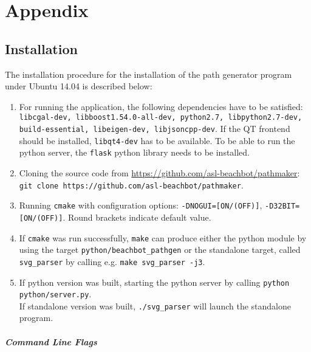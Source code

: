 \chapter{Appendix}
\label{sec:appendix}
\section{Installation}

The installation procedure for the installation of the path generator program under Ubuntu 14.04 is described below:

\begin{enumerate}
\item For running the application, the following dependencies have to be satisfied:
\texttt{libcgal-dev, libboost1.54.0-all-dev, python2.7, libpython2.7-dev, build-essential, libeigen-dev, libjsoncpp-dev}. If the QT frontend should be installed, \texttt{libqt4-dev} has to be available. To be able to run the python server, the \texttt{flask} python library needs to be installed.
\item Cloning the source code from \url{https://github.com/asl-beachbot/pathmaker}: \texttt{git clone https://github.com/asl-beachbot/pathmaker}.
\item Running \texttt{cmake} with configuration options: \texttt{-DNOGUI=[ON/(OFF)]}, \texttt{-D32BIT=[ON/(OFF)]}. Round brackets indicate default value.
\item If \texttt{cmake} was run successfully, \texttt{make} can produce either the python module by using the target \texttt{python/beachbot\_pathgen} or the standalone target, called \texttt{svg\_parser} by calling e.g. \texttt{make svg\_parser -j3}.
\item If python version was built, starting the python server by calling \texttt{python python/server.py}.\\
If standalone version was built, \texttt{./svg\_parser} will launch the standalone program.
\end{enumerate}
\newpage
\paragraph{Command Line Flags}

